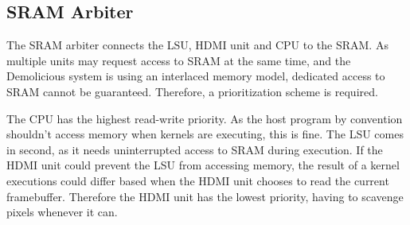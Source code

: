 \subsection{SRAM Arbiter}

The SRAM arbiter connects the LSU, HDMI unit and CPU to the SRAM.
As multiple units may request access to SRAM at the same time, and the Demolicious system is using an interlaced memory model,
dedicated access to SRAM cannot be guaranteed.
Therefore, a prioritization scheme is required.

The CPU has the highest read-write priority.
As the host program by convention shouldn't access memory when kernels are executing, this is fine.
The LSU comes in second, as it needs uninterrupted access to SRAM during execution.
If the HDMI unit could prevent the LSU from accessing memory,
the result of a kernel executions could differ based when the HDMI unit chooses to read the current framebuffer.
Therefore the HDMI unit has the lowest priority, having to scavenge pixels whenever it can.
